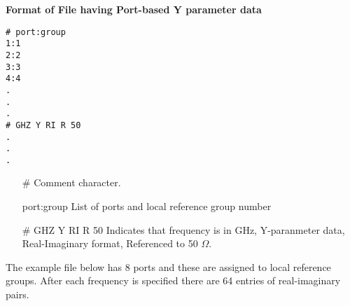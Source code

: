 \documentclass{article}
\begin{document}
\noindent\textbf{Format of File having Port-based Y parameter data}

\begin{verbatim}
# port:group
1:1
2:2
3:3
4:4
.
.
.
# GHZ Y RI R 50
.
.
.
\end{verbatim}

\begin{itemize}
\item[\#] Comment character.
\item[port:group] List of ports and local reference group number
\item[\# GHZ Y RI R 50] Indicates that frequency is in GHz, Y-paranmeter data, Real-Imaginary format, Referenced to 50 $\Omega$.
\end{itemize}

The example file below has 8 ports and these are assigned to local reference groups. After each frequency is specified there are 64 entries of real-imaginary pairs.
\end{document}
